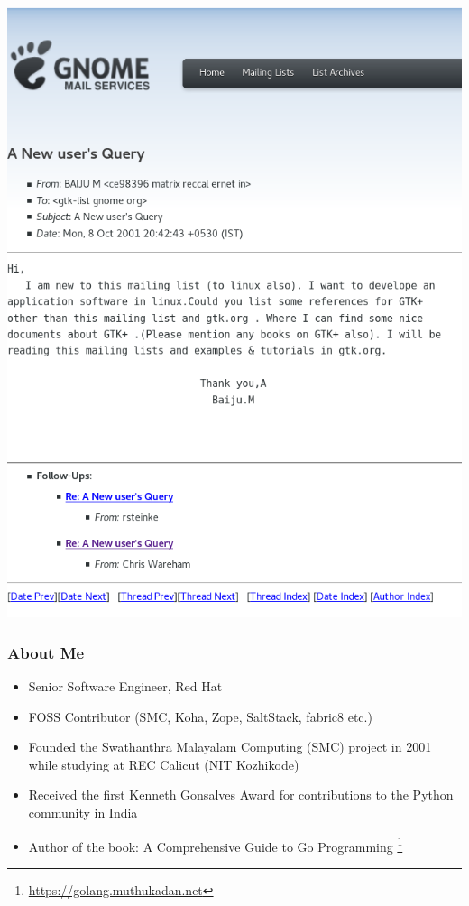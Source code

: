 \documentclass[aspectratio=169]{beamer}
\begin{document}
\begin{frame}[fragile]
  \includegraphics[scale=.25]{images/first-mail.png}
\end{frame}

\begin{frame}
  \frametitle{About Me}

  \begin{itemize}
  \item<1-> Senior Software Engineer, Red Hat
  \item<2-> FOSS Contributor (SMC, Koha, Zope, SaltStack, fabric8 etc.)
  \item<3-> Founded the Swathanthra Malayalam Computing (SMC) project in 2001 while studying at REC Calicut (NIT Kozhikode)
  \item<4-> Received the first Kenneth Gonsalves Award for contributions to the Python community in India
  \item<5-> Author of the book: A Comprehensive Guide to Go Programming \footnote{\url{https://golang.muthukadan.net}}
  \end{itemize}

\end{frame}
\end{document}
